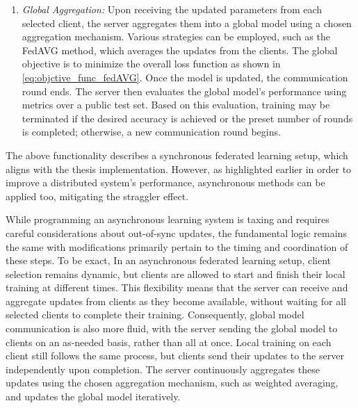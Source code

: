 \begin{enumerate}
    \item \emph{Global Aggregation:}\label{en:aggregation}
          Upon receiving the updated parameters from each selected client, the server aggregates them into a global model using a chosen aggregation
          mechanism. Various strategies can be employed, such as the FedAVG method, which averages the updates from the clients. The global objective
          is to minimize the overall loss function as shown in \cref{eq:objctive_func_fedAVG}. Once the model is updated, the communication round ends.
          The server then evaluates the global model's performance using metrics over a public test set. Based on this evaluation, training may be
          terminated if the desired accuracy is achieved or the preset number of rounds is completed; otherwise, a new communication round begins.
\end{enumerate}

The above functionality describes a synchronous federated learning setup, which aligns with the thesis implementation. However, as highlighted earlier
in order to improve a distributed system's performance, asynchronous methods can be applied too, mitigating the straggler effect.


While programming an asynchronous learning system is taxing and requires careful considerations about out-of-sync updates, the fundamental logic remains the same
with modifications primarily pertain to the timing and coordination of these steps. To be exact, In an asynchronous federated learning setup, client selection remains dynamic,
but clients are allowed to start and finish their local training at different times. This flexibility means that the server can receive and aggregate updates from
clients as they become available, without waiting for all selected clients to complete their training. Consequently, global model communication is also more fluid,
with the server sending the global model to clients on an as-needed basis, rather than all at once. Local training on each client still follows the same process,
but clients send their updates to the server independently upon completion. The server continuously aggregates these updates using the chosen aggregation mechanism,
such as weighted averaging, and updates the global model iteratively.

